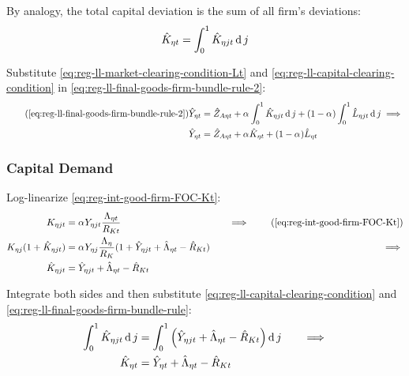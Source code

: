 \documentclass[../thesis.tex]{subfiles}
\begin{document}
By analogy, the total capital deviation is the sum of all firm's deviations:
\begin{align}
	\hat{K}_{\eta t} = \int_{0}^{1} \hat{K}_{\eta jt} \operatorname{d} j \label{eq:reg-ll-capital-clearing-condition}
\end{align}

Substitute \ref{eq:reg-ll-market-clearing-condition-Lt} and \ref{eq:reg-ll-capital-clearing-condition} in \ref{eq:reg-ll-final-goods-firm-bundle-rule-2}:
\begin{align}
	\tag{\ref{eq:reg-ll-final-goods-firm-bundle-rule-2}}
	\hat{Y}_{\eta t} &= \hat{Z}_{A\eta t} + {\alpha_{}} \int_{0}^{1} \hat{K}_{\eta jt} \dif j + (1-{\alpha_{}}) \int_{0}^{1} \hat{L}_{\eta jt} \dif j \implies \\
	\hat{Y}_{\eta t} &= \hat{Z}_{A\eta t} + {\alpha_{}} \hat{K}_{\eta t} + (1-{\alpha_{}}) \hat{L}_{\eta t} \label{eq:reg-ll-final-goods-firm-bundle-rule-3}
\end{align}


\subsubsection*{Capital Demand}

Log-linearize \ref{eq:reg-int-good-firm-FOC-Kt}:
\begin{alignat}{2}
	K_{\eta jt} &= {\alpha_{}} Y_{\eta jt} \frac{\Lambda_{\eta t}}{R_{Kt}} &\implies \tag{\ref{eq:reg-int-good-firm-FOC-Kt}} \\
	K_{\eta j} (1+ \hat{K}_{\eta jt}) &= {\alpha_{}} Y_{\eta j} \frac{\Lambda_{\eta}}{R_{K}} (1+ \hat{Y}_{\eta jt} + \hat{\Lambda}_{\eta t} - \hat{R}_{K t}) \quad &\implies \nonumber \\
	\hat{K}_{\eta jt} &= \hat{Y}_{\eta jt} + \hat{\Lambda}_{\eta t} - \hat{R}_{K t} \nonumber
\end{alignat}

Integrate both sides and then substitute \ref{eq:reg-ll-capital-clearing-condition} and \ref{eq:reg-ll-final-goods-firm-bundle-rule}:
\begin{alignat}{2}
	\int_{0}^{1} \hat{K}_{\eta jt} \operatorname{d} j &= \int_{0}^{1} \left( \hat{Y}_{\eta jt} + \hat{\Lambda}_{\eta t} - \hat{R}_{K t} \right) \operatorname{d} j \quad &\implies \nonumber \\
	\hat{K}_{\eta t} &= \hat{Y}_{\eta t} + \hat{\Lambda}_{\eta t} - \hat{R}_{K t} \label{eq:reg-ll-int-good-firm-FOC-Kt}
\end{alignat}
\end{document}

